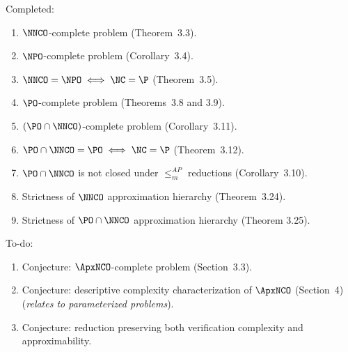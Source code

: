 \documentclass[draft]{article}
\begin{document}
Completed:
\begin{enumerate}
\item $\NNCO$-complete problem (Theorem~3.3).
\item $\NPO$-complete problem (Corollary~3.4).
\item $\NNCO = \NPO \iff \NC = \P$ (Theorem~3.5).

\item $\PO$-complete problem (Theorems~3.8 and 3.9).
\item $(\PO \cap \NNCO)$-complete problem (Corollary~3.11).
\item $\PO \cap \NNCO = \PO \iff \NC = \P$ (Theorem~3.12).

\item $\PO \cap \NNCO$ is not closed under $\leq_m^{AP}$ reductions (Corollary~3.10).

\item Strictness of $\NNCO$ approximation hierarchy (Theorem~3.24).
\item Strictness of $\PO \cap \NNCO$ approximation hierarchy (Theorem 3.25).
\end{enumerate}
To-do:
\begin{enumerate}
\item Conjecture: $\ApxNCO$-complete problem (Section~3.3).
\item Conjecture: descriptive complexity characterization of $\ApxNCO$ (Section~4) (\emph{relates to parameterized problems}).
\item Conjecture: reduction preserving both verification complexity and approximability.
\end{enumerate}
\end{document}
